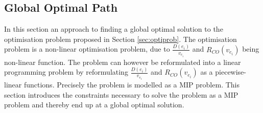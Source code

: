 \subsection{Global Optimal Path}\label{sec:LP}
In this section an approach to finding a global optimal solution to the optimisation problem proposed in Section \ref{sec:optiprob}. The optimisation problem is a non-linear optimisation problem, due to $\frac{D(e_i)}{v_{e_i}}$ and $R_{CO}(v_{e_i})$ being non-linear function. The problem can however be reformulated into a linear programming problem by reformulating $\frac{D(e_i)}{v_{e_i}}$ and $R_{CO}(v_{e_i})$ as a piecewise-linear functions. Precisely the problem is modelled as a MIP problem. This section introduces the constraints necessary to solve the problem as a MIP problem and thereby end up at a global optimal solution.

